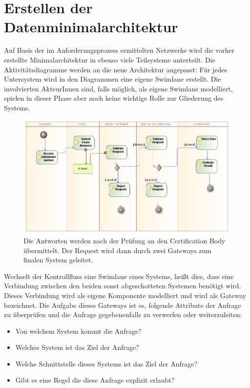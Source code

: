 \section{Erstellen der Datenminimalarchitektur}
Auf Basis der im Anforderungsprozess ermittelten Netzwerke wird die vorher erstellte Minimalarchitektur in ebenso viele Teilsysteme unterteilt. Die Aktivitätsdiagramme werden an die neue Architektur angepasst: Für jedes Untersystem wird in den Diagrammen eine eigene Swimlane erstellt. Die involvierten AkteurInnen sind, falls möglich, als eigene Swimlane modelliert, spielen in dieser Phase aber noch keine wichtige Rolle zur Gliederung des Systems.

\begin{figure}[H]
    \centering
    \includegraphics[scale=0.5]{uml/takeexamactivity1.png}
    \caption{Die Antworten werden nach der Prüfung an den Certification Body übermittelt. Der Request wird dann durch zwei Gateways zum finalen System geleitet.}
\end{figure}

Wechselt der Kontrollfluss eine Swimlane eines Systems, heißt dies, dass eine Verbindung zwischen den beiden sonst abgeschotteten Systemen benötigt wird. Dieses Verbindung wird als eigene Komponente modelliert und wird als Gateway bezeichnet. Die Aufgabe dieses Gateways ist es, folgende Attribute der Anfrage zu überprüfen und die Anfrage gegebenenfalls zu verwerfen oder weiterzuleiten:

\begin{itemize}
  \item Von welchem System kommt die Anfrage?
  \item Welches System ist das Ziel der Anfrage?
  \item Welche Schnittstelle dieses Systems ist das Ziel der Anfrage?
  \item Gibt es eine Regel die diese Anfrage explizit erlaubt?
\end{itemize}

